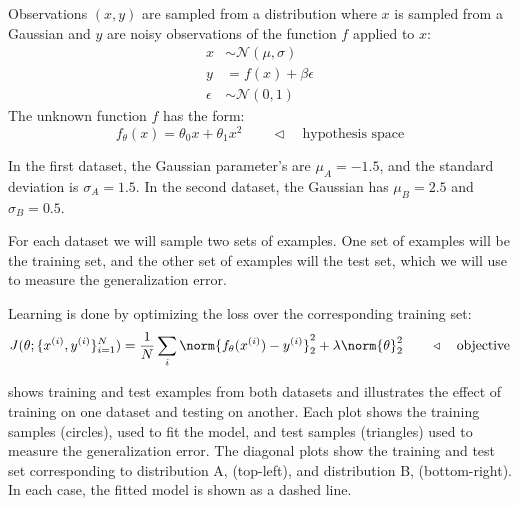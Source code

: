 


Observations $(x,y)$ are sampled from a distribution
where $x$ is sampled from a Gaussian and 
$y$ are noisy observations of the function $f$ applied to $x$:
\begin{align}
    x &\sim \mathcal{N}(\mu,\sigma) \\
    y & = f(x) + \beta \epsilon \\
    \epsilon &\sim \mathcal{N}(0, 1)
\end{align}
The unknown function $f$ has the form:
\begin{equation}
    f_{\theta}(x) = \theta_0 x + \theta_1 x^2 \quad\quad \triangleleft \quad\text{hypothesis space}
\end{equation}

In the first dataset, the Gaussian parameter's are $\mu_A = -1.5$, and the standard deviation is $\sigma_A = 1.5$. In the second dataset, the Gaussian has $\mu_B = 2.5$ and $\sigma_B = 0.5$. 

For each dataset we will sample two sets of examples. One set of examples will be the training set, and the other set of examples will the test set, which we will use to measure the generalization error.

Learning is done by optimizing the loss over the corresponding training set:
\begin{equation}
    J(\theta; \{x^{(i)}, y^{(i)}\}^N_{i=1}) = \frac{1}{N}\sum_i \norm{f_{\theta}(x^{(i)}) - y^{(i)}}_2^2 + \lambda \norm{\theta}_2^2 \quad\quad \triangleleft \quad\text{objective}
\end{equation}


\Fig{\ref{fig:bias_and_shift:training_test_sets}} shows training and test examples from both datasets and illustrates the effect of training on one dataset and testing on another. Each plot shows the training samples (circles), used to fit the model, and test samples (triangles) used to measure the generalization error. The diagonal plots show the training and test set corresponding to distribution A, \fig{\ref{fig:bias_and_shift:training_test_sets}}(top-left), and distribution B, \fig{\ref{fig:bias_and_shift:training_test_sets}}(bottom-right). In each case, the fitted model is shown as a dashed line.

